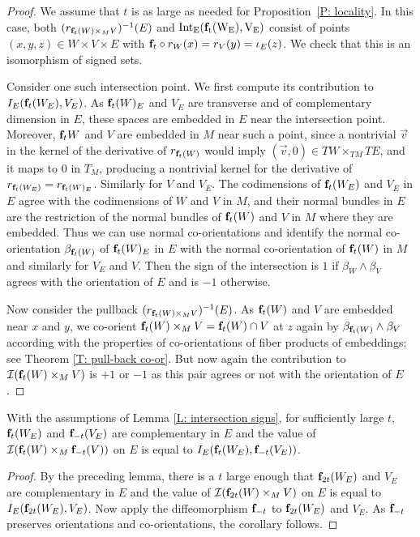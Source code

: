 \begin{proof}
	We assume that $t$ is as large as needed for Proposition~\ref{P: locality}.
	In this case, both $(r_{\mathbf{f}_t(W) \times_M V})^{-1}(E)$ and $\rm{Int}_E(\mathbf{f}_t(W_E), V_E)$ consist of points $(x,y,z)\in W \times V \times E$ with $\mathbf{f}_t \circ r_W (x)= r_V (y)= \iota_E(z)$.
	We check that this is an isomorphism of signed sets.

	Consider one such intersection point. We first compute its contribution to $I_E(\mathbf{f}_t(W_E), V_E)$. As $\mathbf{f}_t(W)_E$ and $V_E$ are transverse and of complementary dimension in $E$, these spaces are embedded in $E$ near the intersection point.
	Moreover, $\mathbf{f}_t W$ and $V$ are embedded in $M$ near such a point, since a nontrivial $\vec v$ in the kernel of the derivative of $r_{\mathbf{f}_t (W)}$ would imply $(\vec v,0)\in TW\times_{TM} TE$, and it maps to $0$ in $T_M$, producing a nontrivial kernel for the derivative of $r_{\mathbf{f}_t(W_E)}=r_{\mathbf{f}_t(W)_E}$. Similarly for $V$ and $V_E$.
	The codimensions of $\mathbf{f}_t (W_E)$ and $V_E$ in $E$ agree with the codimensions of $W$ and $V$ in $M$, and their normal bundles in $E$ are the restriction of the normal bundles of $\mathbf{f}_t(W)$ and $V$ in $M$ where they are embedded.
	Thus we can use normal co-orientations and identify the normal co-orientation $\beta_{\mathbf{f}_t(W)}$ of $\mathbf{f}_t(W)_E$ in $E$ with the normal co-orientation of $\mathbf{f}_t(W)$ in $M$ and similarly for $V_E$ and $V$.
	Then the sign of the intersection is $1$ if $\beta_W \wedge \beta_V$ agrees with the orientation of $E$ and is $-1$ otherwise.

	Now consider the pullback $(r_{\mathbf{f}_t(W) \times_M V})^{-1}(E)$.
	As $\mathbf{f}_t( W)$ and $V$ are embedded near $x$ and $y$, we co-orient $\mathbf{f}_t(W) \times_M V = \mathbf{f}_t(W)\cap V$ at $z$ again by $\beta_{\mathbf{f}_t(W)} \wedge \beta_V$ according with the properties of co-orientations of fiber products of embeddings; see Theorem \ref{T: pull-back co-or}.
	But now again the contribution to $\mathcal{I}(\mathbf{f}_t(W) \times_M V)$ is $+1$ or $-1$ as this pair agrees or not with the orientation of $E$.
\end{proof}

\begin{corollary}\label{C: intersection signs}
	With the assumptions of Lemma \ref{L: intersection signs}, for sufficiently large $t$, $\mathbf{f}_t(W_E)$ and $\mathbf{f}_{-t}(V_E)$ are complementary in $E$ and the value of $\mathcal{I}(\mathbf{f}_t(W) \times_M \mathbf{f}_{-t}(V))$ on $E$ is equal to $I_E(\mathbf{f}_t(W_E), \mathbf{f}_{-t}(V_E))$.
\end{corollary}

\begin{proof}
	By the preceding lemma, there is a $t$ large enough that $\mathbf{f}_{2t}(W_E)$ and $V_E$ are complementary in $E$ and the value of $\mathcal{I}(\mathbf{f}_{2t}(W) \times_M V)$ on $E$ is equal to $I_E(\mathbf{f}_{2t}(W_E), V_E)$.
	Now apply the diffeomorphism $\mathbf{f}_{-t}$ to $\mathbf{f}_{2t}(W_E)$ and $V_E$.
	As $\mathbf{f}_{-t}$ preserves orientations and co-orientations, the corollary follows.
\end{proof}

